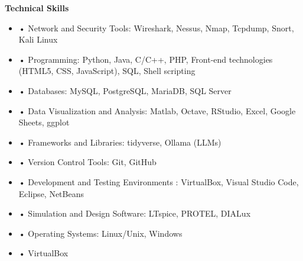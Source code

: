 \documentclass[10pt,a4paper,oneside]{article}
\newlength{\datewidth}
\newlength{\textindent}
\begin{document}
	
	\vspace{5mm}
	
	\textbf{\hspace{\textindent}Technical Skills}
	\begin{itemize}
			\item[\hspace{\datewidth}] \parbox[t]{\dimexpr\linewidth-\datewidth-\textindent}{•  Network and Security Tools: Wireshark, Nessus, Nmap, Tcpdump, Snort, Kali Linux}
			\item[\hspace{\datewidth}] \parbox[t]{\dimexpr\linewidth-\datewidth-\textindent}{•  Programming: Python, Java, C/C++, PHP, Front-end technologies (HTML5, CSS, JavaScript), SQL, Shell scripting}
			\item[\hspace{\datewidth}] \parbox[t]{\dimexpr\linewidth-\datewidth-\textindent}{• Databases: MySQL, PostgreSQL, MariaDB, SQL Server}
			\item[\hspace{\datewidth}] \parbox[t]{\dimexpr\linewidth-\datewidth-\textindent}{•  Data Visualization and Analysis: Matlab, Octave, RStudio, Excel, Google Sheets, ggplot}
			
			\item[\hspace{\datewidth}] \parbox[t]{\dimexpr\linewidth-\datewidth-\textindent}{•  Frameworks and Libraries: tidyverse, Ollama (LLMs)}	
				
			\item[\hspace{\datewidth}] \parbox[t]{\dimexpr\linewidth-\datewidth-\textindent}{•  Version Control Tools: Git, GitHub}
			\item[\hspace{\datewidth}] \parbox[t]{\dimexpr\linewidth-\datewidth-\textindent}{•  Development and Testing Environments : VirtualBox, Visual Studio Code, Eclipse, NetBeans}
			\item[\hspace{\datewidth}] \parbox[t]{\dimexpr\linewidth-\datewidth-\textindent}{•  Simulation and Design Software: LTspice, PROTEL, DIALux}
			\item[\hspace{\datewidth}] \parbox[t]{\dimexpr\linewidth-\datewidth-\textindent}{•  Operating Systems: Linux/Unix, Windows}
                       \item[\hspace{\datewidth}] \parbox[t]{\dimexpr\linewidth-\datewidth-\textindent}{•  VirtualBox}
		\end{itemize}
\end{document}
